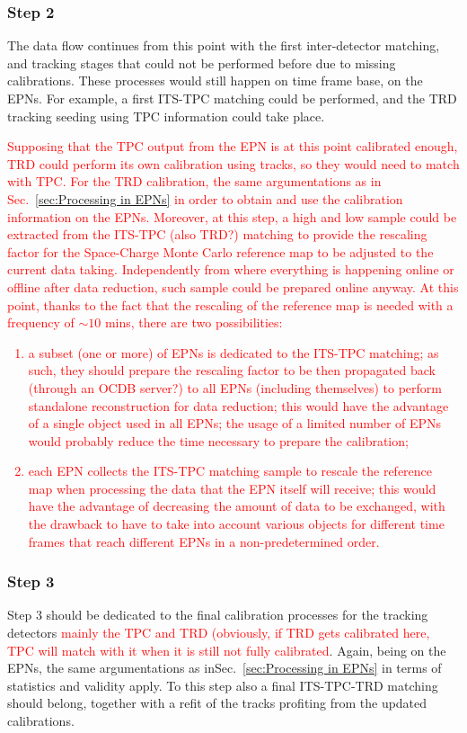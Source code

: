 \subsubsection{Step 2}
\label{sec:Step 2}
The data flow continues from this point with the first inter-detector matching, and tracking stages that could not be performed
before due to missing calibrations. 
These processes would still happen on time frame base, on the EPNs. 
%
For example, a first ITS-TPC matching could be performed, and the TRD tracking seeding
using TPC information could take place. \textcolor{red}{Supposing that the TPC output from the EPN is at this point
calibrated enough, TRD could perform its own calibration using tracks, so they would need to match with TPC. For the 
TRD calibration, the same argumentations as in Sec.~\ref{sec:Processing in EPNs} in order to obtain and use the
calibration information on the EPNs.
Moreover, at this step,
a high and low \pt sample could be extracted from the ITS-TPC (also TRD?) matching to provide the rescaling factor 
for the Space-Charge Monte Carlo reference map to be adjusted to the current data taking. Independently from where 
everything is happening online or offline after data reduction, such sample could be prepared online anyway. At this point,
thanks to the fact that the rescaling of the reference map is needed with a frequency of $\sim 10$ mins, 
there are two possibilities:
\begin{enumerate}
	\item a subset (one or more) of EPNs is dedicated to the ITS-TPC matching; as such, they should prepare the rescaling
	factor to be then propagated back (through an OCDB server?) to all EPNs (including themselves) to perform standalone 
	reconstruction for data reduction; this would have the advantage of a single object used in all EPNs; the usage of a limited number
	of EPNs would probably reduce the time necessary to prepare the calibration;
	\item each EPN collects the ITS-TPC matching sample to rescale the reference map when processing the data that the 
	EPN itself will receive; this would have the advantage of decreasing the amount of data to be exchanged, with the drawback
	to have to take into account various objects for different time frames that reach different EPNs in a non-predetermined order.
\end{enumerate}
}  

\subsubsection{Step 3}
\label{sec:Step 3}
Step 3 should be dedicated to the final calibration processes for the tracking detectors \textcolor{red}{mainly
the TPC and TRD (obviously, if TRD gets calibrated here, TPC will match with it when it is still not fully calibrated}. Again, being 
on the EPNs, the same argumentations as inSec.~\ref{sec:Processing in EPNs} in terms of statistics and validity apply. To this step
also a final ITS-TPC-TRD matching should belong, together with a refit of the tracks profiting from the updated calibrations.

